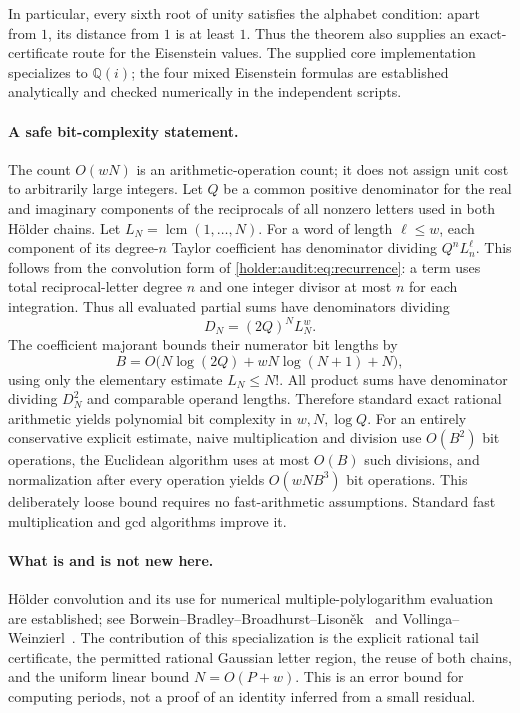 In particular, every sixth root of unity satisfies the alphabet
condition: apart from $1$, its distance from $1$ is at least $1$.
Thus the theorem also supplies an exact-certificate route for the
Eisenstein values. The supplied core implementation specializes to
$\mathbb Q(i)$; the four mixed Eisenstein formulas are established
analytically and checked numerically in the independent scripts.

\paragraph{A safe bit-complexity statement.}
The count $O(wN)$ is an arithmetic-operation count; it does not assign
unit cost to arbitrarily large integers. Let $Q$ be a common positive
denominator for the real and imaginary components of the reciprocals
of all nonzero letters used in both Hölder chains. Let
$L_N=\operatorname{lcm}(1,\ldots,N)$. For a word of length $\ell\leq w$,
each component of its degree-$n$ Taylor coefficient has denominator
dividing $Q^nL_n^\ell$. This follows from the convolution form of
\eqref{holder:audit:eq:recurrence}: a term uses total reciprocal-letter degree
$n$ and one integer divisor at most $n$ for each integration.
Thus all evaluated partial sums have denominators dividing
\[
 D_N=(2Q)^N L_N^w.
\]
The coefficient majorant bounds their numerator bit lengths by
\[
 B=O\bigl(N\log(2Q)+wN\log(N+1)+N\bigr),
\]
using only the elementary estimate $L_N\leq N!$.
All product sums have denominator dividing $D_N^2$ and comparable
operand lengths. Therefore standard exact rational arithmetic yields
polynomial bit complexity in $w,N,\log Q$. For an entirely conservative
explicit estimate, naive multiplication and division use $O(B^2)$ bit
operations, the Euclidean algorithm uses at most $O(B)$ such divisions,
and normalization after every operation yields $O(wNB^3)$ bit
operations. This deliberately loose bound requires no fast-arithmetic
assumptions. Standard fast multiplication and gcd algorithms improve it.

\paragraph{What is and is not new here.}
Hölder convolution and its use for numerical multiple-polylogarithm
evaluation are established; see Borwein--Bradley--Broadhurst--Lison\v ek~\cite{gaussian:BBBL2001}
and Vollinga--Weinzierl~\cite{gaussian:VollingaWeinzierl2005}. The contribution of this specialization is the
explicit rational tail certificate, the permitted rational Gaussian
letter region, the reuse of both chains, and the uniform linear bound
$N=O(P+w)$. This is an error bound for computing periods, not a proof of
an identity inferred from a small residual.

